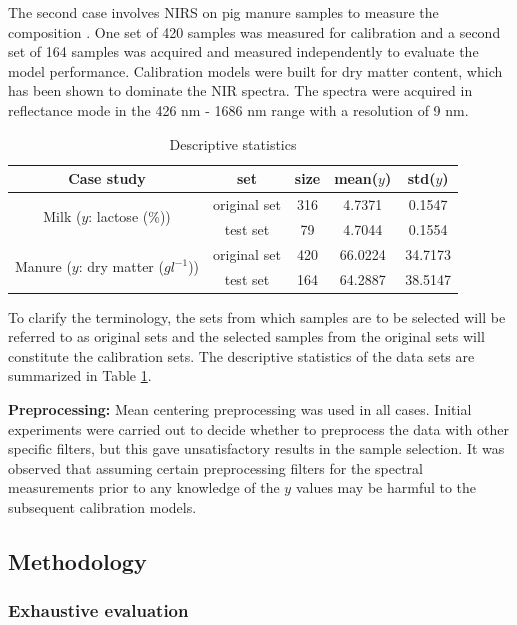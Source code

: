 \documentclass[journal=ancham,manuscript=article]{achemso}
\begin{document}
The second case involves NIRS on pig manure samples to measure the composition \cite{Saeys2005}. One set of 420 samples was measured for calibration and a second set of 164 samples was acquired and measured independently to evaluate the model performance. Calibration models were built for dry matter content, which has been shown to dominate the NIR spectra. The spectra were acquired in reflectance mode in the 426 nm - 1686 nm range with a resolution of 9 nm.


\begin{table}[t]
\centering
\begin{tabular}{|c|c|c|c|c|} 
\hline
Case study	& set & size & mean($y$) & std($y$)  	\\
\hline
\multirow{2}{10em}{Milk ($y$: lactose (\%))} & original set & 316 & 4.7371 & 0.1547\\
& test set & 79 & 4.7044 & 0.1554\\
\hline
\multirow{2}{10em}{Manure ($y$: dry matter ($gl^{-1}$))} & original set & 420 & 66.0224 & 34.7173\\
& test set & 164 & 64.2887 & 38.5147 \\
\hline 


\end{tabular}
\caption{Descriptive statistics}
\label{tab_descriptive_statistics}
\end{table}

To clarify the terminology, the sets from which samples are to be selected will be referred to as original sets and the selected samples from the original sets will constitute the calibration sets. The descriptive statistics of the data sets are summarized in Table \ref{tab_descriptive_statistics}.

\textbf{Preprocessing:} Mean centering preprocessing was used in all cases. Initial experiments were carried out to decide whether to preprocess the data with other specific filters, but this gave unsatisfactory results in the sample selection. It was observed that assuming certain preprocessing filters for the spectral measurements prior to any knowledge of the $y$ values may be harmful to the subsequent calibration models. 



\subsection{Methodology}\label{methodology}

\subsubsection{Exhaustive evaluation}
\end{document}
